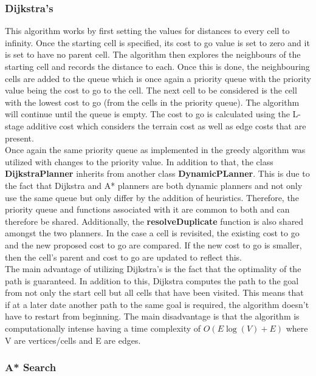 \documentclass[a4paper,12pt]{article}
\begin{document}
			\subsubsection{Dijkstra's}
			
				This algorithm works by first setting the values for distances to every cell to infinity. Once the starting cell is specified, its cost to go value is set to zero and it is set to have no parent cell. The algorithm then explores the neighbours of the starting cell and records the distance to each. Once this is done, the neighbouring cells are added to the queue which is once again a priority queue with the priority value being the cost to go to the cell. The next cell to be considered is the cell with the lowest cost to go (from the cells in the priority queue). The algorithm will continue until the queue is empty. The cost to go is calculated using the L-stage additive cost which considers the terrain cost as well as edge costs that are present. 
				\\
				Once again the same priority queue as implemented in the greedy algorithm was utilized with changes to the priority value. In addition to that, the class \textbf{DijkstraPlanner} inherits from another class \textbf{DynamicPLanner}. This is due to the fact that Dijkstra and A* planners are both dynamic planners and not only use the same queue but only differ by the addition of heuristics. Therefore, the priority queue and functions associated with it are common to both and can therefore be shared. Additionally, the \textbf{resolveDuplicate} function is also shared amongst the two planners. In the case a cell is revisited, the existing cost to go and the new proposed cost to go are compared. If the new cost to go is smaller, then the cell's parent and cost to go are updated to reflect this. 
				\\
				The main advantage of utilizing Dijkstra's is the fact that the optimality of the path is guaranteed. In addition to this, Dijkstra computes the path to the goal from not only the start cell but all cells that have been visited. This means that if at a later date another path to the same goal is required, the algorithm doesn't have to restart from beginning. The main disadvantage is that the algorithm is computationally intense having a time complexity of $O(E\log(V)+E)$ where V are vertices/cells and E are edges. 
				
			\subsubsection{A* Search}
			
\end{document}
